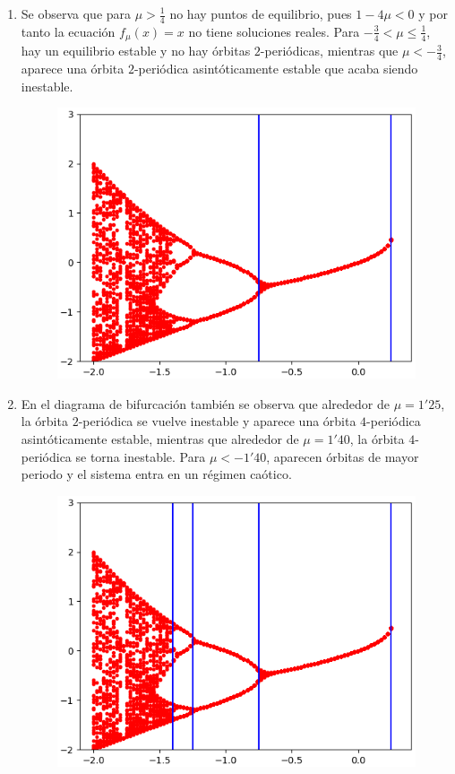\documentclass[11pt]{report}
\begin{document}
\begin{solution}
\begin{enumerate}
\begin{itemize}
        \end{itemize}
        \item Se observa que para $\mu > \frac{1}{4}$ no hay puntos de equilibrio, pues $1-4\mu < 0$ y por tanto la ecuación $f_\mu(x) = x$ no tiene soluciones reales. Para $-\frac{3}{4} < \mu \leq \frac{1}{4}$, hay un equilibrio estable y no hay órbitas $2$-periódicas, mientras que $\mu < -\frac{3}{4}$, aparece una órbita $2$-periódica asintóticamente estable que acaba siendo inestable.
        \begin{figure}[H]
        \centering
        \includegraphics[scale = 0.8]{./img/Figure_1.png}
        \end{figure}
        \item En el diagrama de bifurcación también se observa que alrededor de $\mu = 1'25$, la órbita $2$-periódica se vuelve inestable y aparece una órbita $4$-periódica asintóticamente estable, mientras que alrededor de $\mu = 1'40$, la órbita $4$-periódica se torna inestable. Para $\mu < -1'40$, aparecen órbitas de mayor periodo y el sistema entra en un régimen caótico.
        \begin{figure}[H]
        \centering
        \includegraphics[scale = 0.8]{./img/Figure_2.png}
        \end{figure}
    \end{enumerate}
\end{solution}
\end{document}
